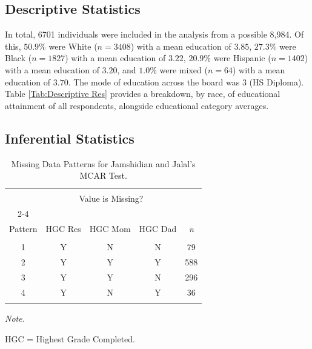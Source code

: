 \documentclass[jou,12pt,floatsintext]{apa7}
\begin{document}
\subsection{Descriptive Statistics}

In total, 6701 individuals were included in the analysis from a possible 8,984. Of this, $50.9\%$ were White ($\textit{n}=3408$) with a mean education of $3.85$, $27.3\%$ were Black ($\textit{n}=1827$) with a mean education of $3.22$, $20.9\%$ were Hispanic ($\textit{n}=1402$) with a mean education of $3.20$, and $1.0\%$ were mixed ($\textit{n}=64$) with a mean education of $3.70$. The mode of education across the board was $3$ (HS Diploma). Table \ref{Tab:Descriptive Res} provides a breakdown, by race, of educational attainment of all respondents, alongside educational category averages.

\subsection{Inferential Statistics}

\begin{table} \centering
  \begin{threeparttable}
    \caption{Missing Data Patterns for Jamshidian and Jalal's MCAR Test.}
    \label{Tab:MCAR}
    \small
    \setlength{\tabcolsep}{4pt}
    \begin{tabular*}{\columnwidth}{@{\extracolsep{\fill}}ccccc@{}}
      \toprule \\[-1.8ex]
      & \multicolumn{3}{c}{Value is Missing?} &                                        \\
      \cline{2-4}                                                                      \\[-1.8ex]
      Pattern & HGC Res                               & HGC Mom & HGC Dad & \textit{n} \\
      \midrule                                                                         \\[-1.8ex]
      1       & Y                                     & N       & N       & 79         \\
      2       & Y                                     & Y       & Y       & 588        \\
      3       & Y                                     & Y       & N       & 296        \\
      4       & Y                                     & N       & Y       & 36         \\
      \bottomrule                                                                      \\[-1.8ex]
    \end{tabular*}
    \normalsize
    \begin{tablenotes}
      \item \textit{Note.}
      \item HGC = Highest Grade Completed.
    \end{tablenotes}
  \end{threeparttable}
\end{table}
\end{document}
